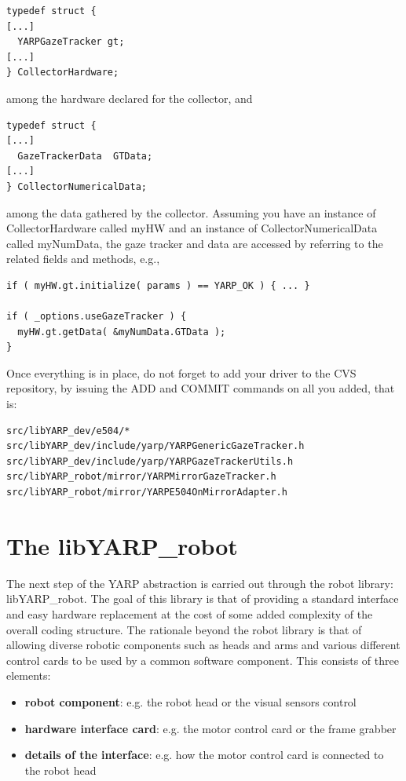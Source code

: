 \begin{verbatim}
typedef struct {
[...]
  YARPGazeTracker gt;
[...]
} CollectorHardware;
\end{verbatim}

\noindent among the hardware declared for the collector, and

\begin{verbatim}
typedef struct {
[...]
  GazeTrackerData  GTData;
[...]
} CollectorNumericalData;
\end{verbatim}

\noindent among the data gathered by the collector. Assuming you have
an instance of CollectorHardware called myHW and an instance of
CollectorNumericalData called myNumData, the gaze tracker and data are
accessed by referring to the related fields and methods, e.g.,

\begin{verbatim}
if ( myHW.gt.initialize( params ) == YARP_OK ) { ... }

if ( _options.useGazeTracker ) {
  myHW.gt.getData( &myNumData.GTData );
}
\end{verbatim}

Once everything is in place, do not forget to add your driver to the
CVS repository, by issuing the ADD and COMMIT commands on all you
added, that is:

\begin{verbatim}
src/libYARP_dev/e504/*
src/libYARP_dev/include/yarp/YARPGenericGazeTracker.h
src/libYARP_dev/include/yarp/YARPGazeTrackerUtils.h
src/libYARP_robot/mirror/YARPMirrorGazeTracker.h
src/libYARP_robot/mirror/YARPE504OnMirrorAdapter.h
\end{verbatim}

\section{The libYARP\_robot}
The next step of the YARP abstraction is carried out through the robot library: libYARP\_robot. The goal of this library is that of providing a standard interface and easy hardware replacement at the cost of some added complexity of the overall coding structure. The rationale beyond the robot library is that of allowing diverse robotic components such as heads and arms and various different control cards to be used by a common software component. This consists of three elements:

\begin{itemize}
\item {\bf robot component}: e.g. the robot head or the visual sensors control
\item {\bf hardware interface card}: e.g. the motor control card or the frame grabber
\item {\bf details of the interface}: e.g. how the motor control card is connected to the robot head
\end{itemize}


